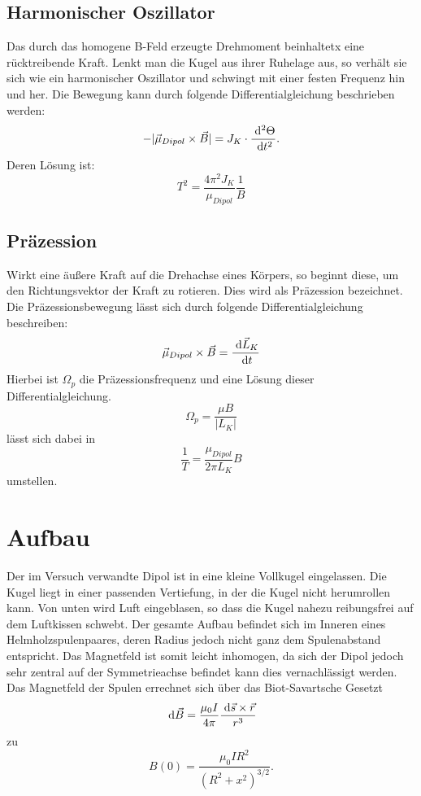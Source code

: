   \subsection{Harmonischer Oszillator}
  Das durch das homogene B-Feld erzeugte Drehmoment beinhaltetx eine rücktreibende Kraft. Lenkt man die Kugel aus ihrer Ruhelage aus, so verhält sie sich wie ein harmonischer Oszillator und schwingt mit einer festen Frequenz hin und her.
Die Bewegung kann durch folgende Differentialgleichung beschrieben werden:
\begin{equation}
-|\vec{\mu}_{Dipol} \times \vec{B}| = J_K \cdot \frac{\; \mathrm{d}^2 \Theta}{\; \mathrm{d} t^2}.
\end{equation}
Deren Lösung ist:
\begin{equation}
T^2=\frac{4\pi^2J_K}{\mu_{Dipol}} \frac{1}{B}
\label{oszi}
\end{equation}
  \subsection{Präzession}
 Wirkt eine äußere Kraft auf die Drehachse eines Körpers, so beginnt diese, um den Richtungsvektor der Kraft zu rotieren. Dies wird als Präzession bezeichnet.
Die Präzessionsbewegung lässt sich durch folgende Differentialgleichung beschreiben:
\begin{equation}
\vec{\mu}_{Dipol} \times \vec{B} = \frac{\; \mathrm{d} \vec{L}_K}{\; \mathrm{d} t}
\end{equation}
Hierbei ist $\Omega_p$ die Präzessionsfrequenz und eine Lösung dieser Differentialgleichung.
\begin{equation}
\Omega_p = \frac{\mu B}{|L_K|}
\end{equation}
lässt sich dabei in
\begin{equation}
\frac{1}{T} = \frac{\mu_{Dipol}}{2 \pi L_K} B
\label{prae}
\end{equation}
umstellen.
\section{Aufbau}
Der im Versuch verwandte Dipol ist in eine kleine Vollkugel eingelassen. Die Kugel liegt in einer passenden Vertiefung, in der die Kugel nicht herumrollen kann. Von unten wird Luft eingeblasen, so dass die Kugel nahezu reibungsfrei auf dem Luftkissen schwebt.
Der gesamte Aufbau befindet sich im Inneren eines Helmholzspulenpaares, deren Radius jedoch nicht ganz dem Spulenabstand entspricht. Das Magnetfeld ist somit leicht inhomogen, da sich der Dipol jedoch sehr zentral auf der Symmetrieachse befindet kann dies vernachlässigt werden.
Das Magnetfeld der Spulen errechnet sich über das Biot-Savartsche Gesetzt
\begin{equation}
\; \mathrm{d} \vec{B} = \frac{\mu_0 I}{4\pi} \frac{\; \mathrm{d} \vec{s} \times \vec{r}}{r^3}
\end{equation} 
zu
\begin{equation}
B(0)=\frac{\mu_0 IR^2}{(R^2+x^2)^{3/2}}.
\end{equation}

